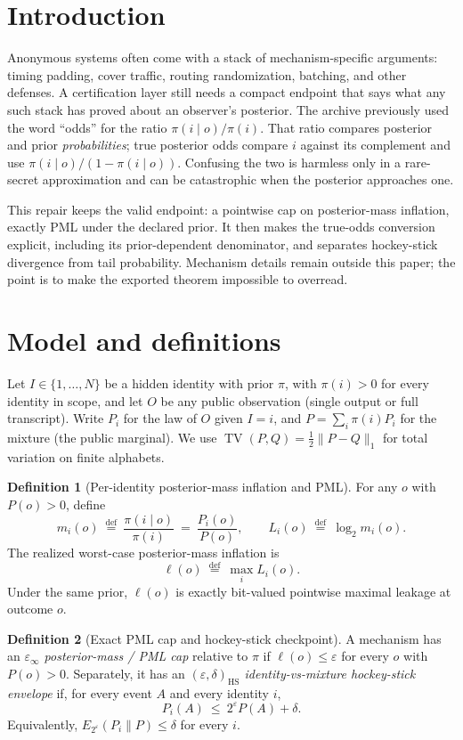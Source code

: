 \documentclass[11pt]{article}
\DeclareMathOperator{\TV}{TV}
\newcommand{\defeq}{\stackrel{\mathrm{def}}{=}}
\theoremstyle{definition}
\newtheorem{definition}{Definition}
\theoremstyle{remark}
\begin{document}
\section{Introduction}
Anonymous systems often come with a stack of mechanism-specific arguments: timing padding, cover traffic, routing randomization, batching, and other defenses.
A certification layer still needs a compact endpoint that says what any such stack has proved about an observer's posterior.
The archive previously used the word ``odds'' for the ratio $\pi(i\mid o)/\pi(i)$.
That ratio compares posterior and prior \emph{probabilities}; true posterior odds compare $i$ against its complement and use $\pi(i\mid o)/(1-\pi(i\mid o))$.
Confusing the two is harmless only in a rare-secret approximation and can be catastrophic when the posterior approaches one.

This repair keeps the valid endpoint: a pointwise cap on posterior-mass inflation, exactly PML under the declared prior.
It then makes the true-odds conversion explicit, including its prior-dependent denominator, and separates hockey-stick divergence from tail probability.
Mechanism details remain outside this paper; the point is to make the exported theorem impossible to overread.

\section{Model and definitions}
Let $I\in\{1,\dots,N\}$ be a hidden identity with prior $\pi$, with $\pi(i)>0$ for every identity in scope, and let $O$ be any public observation (single output or full transcript).
Write $P_i$ for the law of $O$ given $I=i$, and $P=\sum_i \pi(i)P_i$ for the mixture (the public marginal).
We use $\TV(P,Q)=\tfrac12\|P-Q\|_1$ for total variation on finite alphabets.

\begin{definition}[Per-identity posterior-mass inflation and PML]\label{def:mass_inflation}
For any $o$ with $P(o)>0$, define
\[
m_i(o)\ \defeq\ \frac{\pi(i\mid o)}{\pi(i)}\ =\ \frac{P_i(o)}{P(o)},
\qquad
L_i(o)\ \defeq\ \log_2 m_i(o).
\]
The realized worst-case posterior-mass inflation is
\[
\ell(o)\ \defeq\ \max_i L_i(o).
\]
Under the same prior, $\ell(o)$ is exactly bit-valued pointwise maximal leakage at outcome $o$.
\end{definition}

\begin{definition}[Exact PML cap and hockey-stick checkpoint]\label{def:epsinf}
A mechanism has an \emph{$\varepsilon_\infty$ posterior-mass / PML cap} relative to $\pi$ if $\ell(o)\le \varepsilon$ for every $o$ with $P(o)>0$.
Separately, it has an \emph{$(\varepsilon,\delta)_{\mathrm{HS}}$ identity-vs-mixture hockey-stick envelope} if, for every event $A$ and every identity $i$,
\begin{equation}\label{eq:hockeystick}
P_i(A)\ \le\ 2^\varepsilon P(A)+\delta.
\end{equation}
Equivalently, $E_{2^\varepsilon}(P_i\|P)\le\delta$ for every $i$.
\end{definition}
\end{document}
